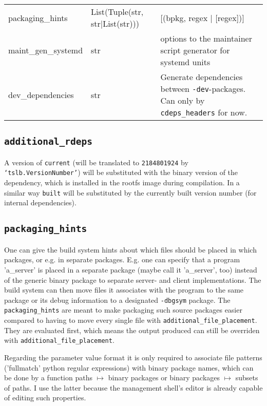 \documentclass[a4paper]{scrartcl}
\newcommand{\python}[1]{\texttt{`#1'}}
\begin{document}
\begin{tabularx}{\textwidth}{llX}
		packaging\_hints & List(Tuple(str, str|List(str))) & [(bpkg, regex | [regex])] \\
		maint\_gen\_systemd & str & options to the maintainer script generator for systemd units \\
		
		dev\_dependencies & str & Generate dependencies between \texttt{-dev}-packages. Can only by \texttt{cdeps\_headers} for now. \\
	\end{tabularx}

	\subsection{\texttt{additional\_rdeps}}
	\label{sec:additional_rdeps}
	
	A version of \texttt{current} (will be translated to \texttt{2184801924} by \python{tslb.VersionNumber}) will be substituted with the binary version of the dependency, which is installed in the rootfs image during compilation. In a similar way \texttt{built} will be substituted by the currently built version number (for internal dependencies).
	
	\subsection{\texttt{packaging\_hints}}
	\label{sec:packaging_hints}
	
	One can give the build system hints about which files should be placed in which packages, or e.g. in separate packages. E.g. one can specify that a program 'a\_server' is placed in a separate package (maybe call it 'a\_server', too) instead of the generic binary package to separate server- and client implementations. The build system can then move files it associates with the program to the same package or its debug information to a designated \texttt{-dbgsym} package. The \texttt{packaging\_hints} are meant to make packaging such source packages easier compared to having to move every single file with \texttt{additional\_file\_placement}. They are evaluated first, which means the output produced can still be overriden with \texttt{additional\_file\_placement}.
	
	Regarding the parameter value format it is only required to associate file patterns ('fullmatch' python regular expressions) with binary package names, which can be done by a function paths $\mapsto$ binary packages or binary packages $\mapsto$ subsets of paths. I use the latter because the management shell's editor is already capable of editing such properties.
	
\end{document}

